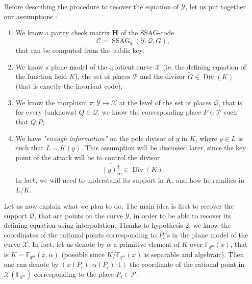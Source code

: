 \documentclass[10pt]{article}
\theoremstyle{definition}
\theoremstyle{definition}
\newtheorem{rq1}[thm]{Remark}
\theoremstyle{definition}
\newcommand{\s}{\vspace{0.3cm}}
\newcommand{\fqm}{\mathbb{F}_{q^m}}
\newcommand{\su}{\subseteq}
\newcommand{\X}{\mathcal{X}}
\newcommand{\Y}{\mathcal{Y}}
\newcommand{\PR}{\mathcal{P}}
\newcommand{\QR}{\mathcal{Q}}
\newcommand{\Div}{\operatorname{Div}}
\newcommand{\Aut}{\operatorname{Aut}}
\newcommand{\ssag}{\operatorname{SSAG}}
\newcommand{\hugues}[1]{\textcolor{blue}{#1}}
\newcommand{\notehugues}[1]{\marginpar{\small\hugues{#1}}}
\begin{document}

\s

Before describing the procedure to recover the equation of $\Y$, let us put together our assumptions :

\begin{enumerate}
\item We know a parity check matrix $\mathbf{H}$ of the SSAG-code  \[\mathcal{C} = \ssag_q(\Y,\QR,G),\]
that can be computed from the public key;
\item We know a plane model of the quotient curve $\X$ (ie. the defining equation of the function field $K$), the set of places $\PR$ and the divisor $\tilde{G} \in \Div(K)$ (that is exactly the invariant code);
\item We know the morphism $\pi : \Y \longmapsto \X$ at the level of the set of places $\QR$, that is for every (unknown) $Q \in \QR$, we know the corresponding place $P \in \PR$ such that $Q|P$;
\item We have \emph{"enough information"} on the pole divisor of $y$ in $K$, where $y \in L$ is such that $L=K(y)$. This assumption will be discussed later, since the key point of the attack will be to control the divisor 
\[\widetilde{(y)^L_{\infty}} \in \Div(K).\] 
In fact, we will need to understand its support in $K$, and how he ramifies in $L/K$.
\end{enumerate}
\s
Let us now explain what we plan to do. The main idea is first to recover the support $\QR$, that are points on the curve $\Y$, in order to be able to recover its defining equation using interpolation. Thanks to hypothesis $2$, we know the coordinates of the rational points corresponding to $P_i$'s in the plane model of the curve $\X$. In fact, let us denote by $\alpha$ a primitive element of $K$ over $\fqm(x)$, that is $K = \fqm(x,\alpha)$ (possible since $K/\fqm(x)$ is separable and algebraic). Then one can denote by $(x(P_i):\alpha(P_i):1)$ the coordinate of the rational point in $\X(\fqm)$ corresponding to the place $P_i \in \PR$. 
\end{document}
